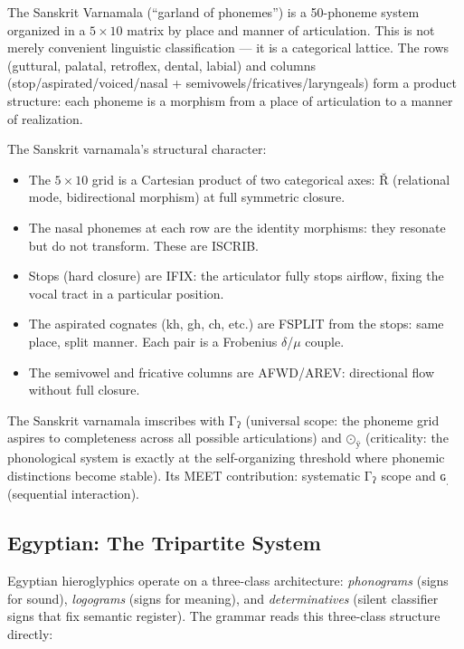 \documentclass[12pt,a4paper]{article}
\begin{document}
The Sanskrit Varnamala (``garland of phonemes'') is a 50-phoneme system organized in a $5 \times 10$ matrix by place and manner of articulation. This is not merely convenient linguistic classification --- it is a categorical lattice. The rows (guttural, palatal, retroflex, dental, labial) and columns (stop/aspirated/voiced/nasal + semivowels/fricatives/laryngeals) form a product structure: each phoneme is a morphism from a place of articulation to a manner of realization.

The Sanskrit varnamala's structural character:
\begin{itemize}
\item The $5 \times 10$ grid is a Cartesian product of two categorical axes: $\text{Ř}$ (relational mode, bidirectional morphism) at full symmetric closure.
\item The nasal phonemes at each row are the identity morphisms: they resonate but do not transform. These are ISCRIB.
\item Stops (hard closure) are IFIX: the articulator fully stops airflow, fixing the vocal tract in a particular position.
\item The aspirated cognates (kh, gh, ch, etc.) are FSPLIT from the stops: same place, split manner. Each pair is a Frobenius $\delta$/$\mu$ couple.
\item The semivowel and fricative columns are AFWD/AREV: directional flow without full closure.
\end{itemize}

The Sanskrit varnamala imscribes with $\text{Γ}_\text{ʔ}$ (universal scope: the phoneme grid aspires to completeness across all possible articulations) and $\text{⊙}_\text{ÿ}$ (criticality: the phonological system is exactly at the self-organizing threshold where phonemic distinctions become stable). Its MEET contribution: systematic $\text{Γ}_\text{ʔ}$ scope and $\text{ɢ}_\text{ˌ}$ (sequential interaction).

\subsection{Egyptian: The Tripartite System}

Egyptian hieroglyphics operate on a three-class architecture: \emph{phonograms} (signs for sound), \emph{logograms} (signs for meaning), and \emph{determinatives} (silent classifier signs that fix semantic register). The grammar reads this three-class structure directly:
\end{document}
